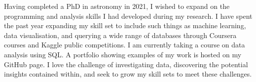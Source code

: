 Having completed a PhD in astronomy in 2021, I wished to expand on the programming and analysis skills I had developed during my research. I have spent the past year expanding my skill set to include such things as machine learning, data visualisation, and querying a wide range of databases through Coursera courses and Kaggle public competitions. I am currently taking a course on data analysis using SQL. A portfolio showing examples of my work is hosted on my GitHub page. I love the challenge of investigating data, discovering the potential insights contained within, and seek to grow my skill sets to meet these challenges.\\
\\